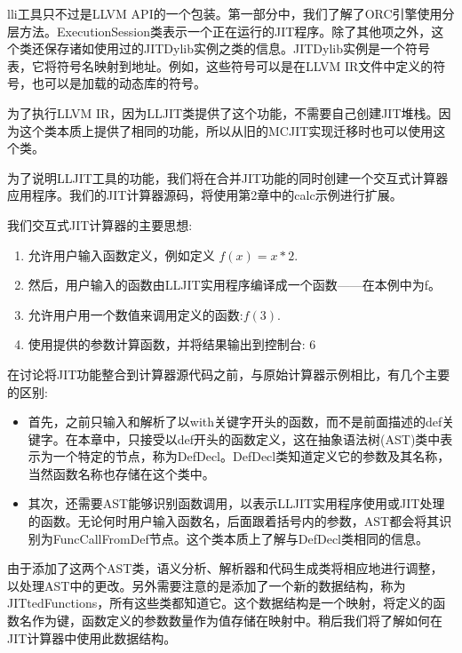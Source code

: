 
lli工具只不过是LLVM API的一个包装。第一部分中，我们了解了ORC引擎使用分层方法。ExecutionSession类表示一个正在运行的JIT程序。除了其他项之外，这个类还保存诸如使用过的JITDylib实例之类的信息。JITDylib实例是一个符号表，它将符号名映射到地址。例如，这些符号可以是在LLVM IR文件中定义的符号，也可以是加载的动态库的符号。

为了执行LLVM IR，因为LLJIT类提供了这个功能，不需要自己创建JIT堆栈。因为这个类本质上提供了相同的功能，所以从旧的MCJIT实现迁移时也可以使用这个类。

为了说明LLJIT工具的功能，我们将在合并JIT功能的同时创建一个交互式计算器应用程序。我们的JIT计算器源码，将使用第2章中的calc示例进行扩展。

我们交互式JIT计算器的主要思想:

\begin{enumerate}
\item
允许用户输入函数定义，例如定义 $f(x) = x*2$.

\item
然后，用户输入的函数由LLJIT实用程序编译成一个函数——在本例中为f。

\item
允许用户用一个数值来调用定义的函数:$f(3)$.

\item
使用提供的参数计算函数，并将结果输出到控制台: 6
\end{enumerate}

在讨论将JIT功能整合到计算器源代码之前，与原始计算器示例相比，有几个主要的区别:

\begin{itemize}
\item
首先，之前只输入和解析了以with关键字开头的函数，而不是前面描述的def关键字。在本章中，只接受以def开头的函数定义，这在抽象语法树(AST)类中表示为一个特定的节点，称为DefDecl。DefDecl类知道定义它的参数及其名称，当然函数名称也存储在这个类中。

\item
其次，还需要AST能够识别函数调用，以表示LLJIT实用程序使用或JIT处理的函数。无论何时用户输入函数名，后面跟着括号内的参数，AST都会将其识别为FuncCallFromDef节点。这个类本质上了解与DefDecl类相同的信息。
\end{itemize}

由于添加了这两个AST类，语义分析、解析器和代码生成类将相应地进行调整，以处理AST中的更改。另外需要注意的是添加了一个新的数据结构，称为JITtedFunctions，所有这些类都知道它。这个数据结构是一个映射，将定义的函数名作为键，函数定义的参数数量作为值存储在映射中。稍后我们将了解如何在JIT计算器中使用此数据结构。

